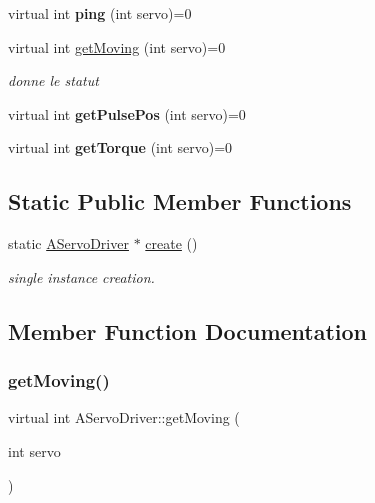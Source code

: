 \begin{DoxyCompactItemize}
\mbox{\label{classAServoDriver_a75ffc42390ff51d5d8b56985d3c93a47}} 
virtual int {\bfseries ping} (int servo)=0
\item 
virtual int \hyperlink{classAServoDriver_a954ac7340407b997387d84d7059ed32b}{get\+Moving} (int servo)=0
\begin{DoxyCompactList}\small\item\em donne le statut \end{DoxyCompactList}\item 
\mbox{\label{classAServoDriver_a478684e583054bdff2d31ee2c7aa944d}} 
virtual int {\bfseries get\+Pulse\+Pos} (int servo)=0
\item 
\mbox{\label{classAServoDriver_a9a95b8efce958c283fb4ef65649a38cd}} 
virtual int {\bfseries get\+Torque} (int servo)=0
\end{DoxyCompactItemize}
\subsection*{Static Public Member Functions}
\begin{DoxyCompactItemize}
\item 
\mbox{\label{classAServoDriver_a82847339a8d4bf66b8bcd372ef0f2f4a}} 
static \hyperlink{classAServoDriver}{A\+Servo\+Driver} $\ast$ \hyperlink{classAServoDriver_a82847339a8d4bf66b8bcd372ef0f2f4a}{create} ()
\begin{DoxyCompactList}\small\item\em single instance creation. \end{DoxyCompactList}\end{DoxyCompactItemize}


\subsection{Member Function Documentation}
\mbox{\label{classAServoDriver_a954ac7340407b997387d84d7059ed32b}} 
\subsubsection{\texorpdfstring{get\+Moving()}{getMoving()}}
{\footnotesize\ttfamily virtual int A\+Servo\+Driver\+::get\+Moving (\begin{DoxyParamCaption}\item[{int}]{servo }\end{DoxyParamCaption})\hspace{0.3cm}{\ttfamily [pure virtual]}}



